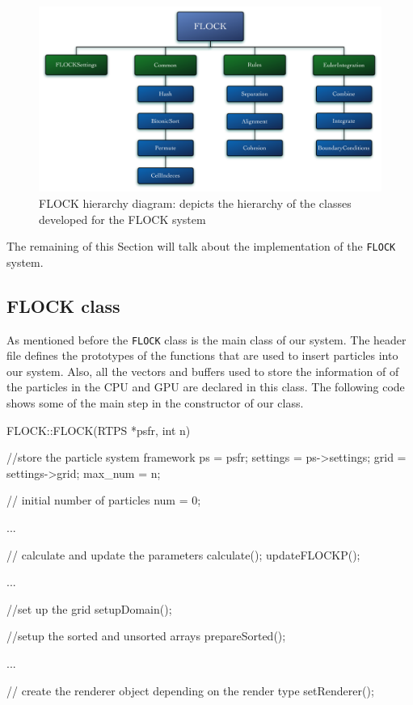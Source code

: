 \begin{figure}[htbp]
\begin{center}
\includegraphics[scale=0.3]{figures/FLOCKdiagramMyrna.pdf}
\caption{FLOCK hierarchy diagram: depicts the hierarchy of the classes developed for the FLOCK system}
\label{flockdiagram}
\end{center}
\end{figure}


The remaining of this Section will talk about the implementation of the \texttt{FLOCK} system.

\subsection{FLOCK class}
As mentioned before the \texttt{FLOCK} class is the main class of our system. The header file defines the prototypes of the functions that are used to insert particles into our system. Also, all the vectors and buffers used to store the information of of the particles in the CPU and GPU are declared in this class. The following code shows some of the main step in the constructor of our class.

\begin{cppcode}{0}
FLOCK::FLOCK(RTPS *psfr, int n)
 {
 	//store the particle system framework
 	ps = psfr;
	settings = ps->settings;
	grid = settings->grid;
	max_num = n;
	
	// initial number of particles
	num = 0;
 	
	...
 
 	// calculate and update the parameters
	calculate();
	updateFLOCKP();

	...

	//set up the grid
	setupDomain();
	
	//setup the sorted and unsorted arrays
	prepareSorted();
 	 
	 ...
		
	// create the renderer object depending on the render type		
	setRenderer(); 
}
\end{cppcode}

